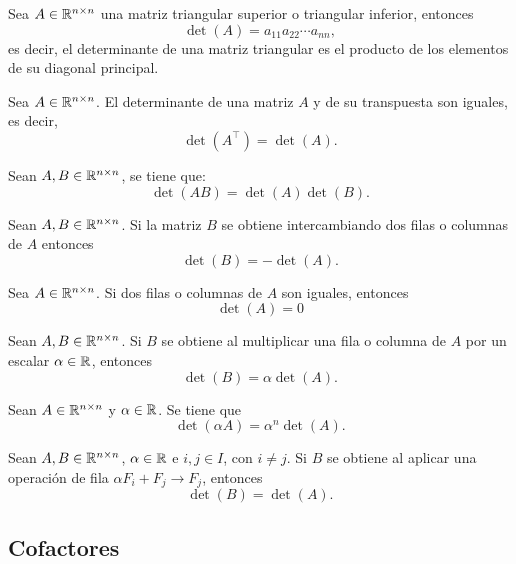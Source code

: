 \documentclass[a4,11pt]{aleph-notas}
\begin{document}
\begin{teo}
    Sea $A \in \Mat[\R]{n}{n}$ una matriz triangular superior o triangular inferior, entonces
    \[
        \det(A) = a_{11}a_{22} \cdots a_{nn},
    \]
    es decir, el determinante de una matriz triangular es el producto de los elementos de su diagonal principal.
\end{teo}

\begin{teo}
    Sea $A \in \Mat[\R]{n}{n}$. El determinante de una matriz $A$ y de su transpuesta son iguales, es decir, 
    \[
        \det(A^\intercal) = \det(A).
    \]
\end{teo}

\begin{teo}
    Sean $A, B\in \Mat[\R]{n}{n}$, se tiene que:
    \[
        \det(AB) = \det(A)\det(B).
    \]
\end{teo}


\begin{teo}
    Sean $A, B \in \Mat[\R]{n}{n}$. Si la matriz $B$ se obtiene intercambiando dos filas o columnas de $A$ entonces
    \[  
        \det(B) = - \det(A).
    \]
\end{teo}

\begin{teo}
    Sea $A \in \Mat[\R]{n}{n}$. Si dos filas o columnas de $A$ son iguales, entonces 
    \[
        \det(A) = 0
    \]
\end{teo}

\begin{teo}
    Sean $A, B \in \Mat[\R]{n}{n}$. Si $B$ se obtiene al multiplicar una fila o columna de $A$ por un escalar $\alpha \in \R$, entonces
    \[
        \det(B) = \alpha \det(A).
    \]
\end{teo}


\begin{teo}
    Sean $A\in \Mat[\R]{n}{n}$ y $\alpha \in\R$. Se tiene que
    \[
        \det(\alpha A) = \alpha^n \det(A).
    \]
\end{teo}

\begin{teo}
    Sean $A, B \in \Mat[\R]{n}{n}$, $\alpha\in\R$ e $i,j\in I$, con $i\neq j$. Si $B$ se obtiene al aplicar una operación de fila $\alpha F_i + F_j \to F_j$, entonces 
    \[
        \det(B) = \det(A).
    \]
\end{teo}


\subsection{Cofactores}
\end{document}
